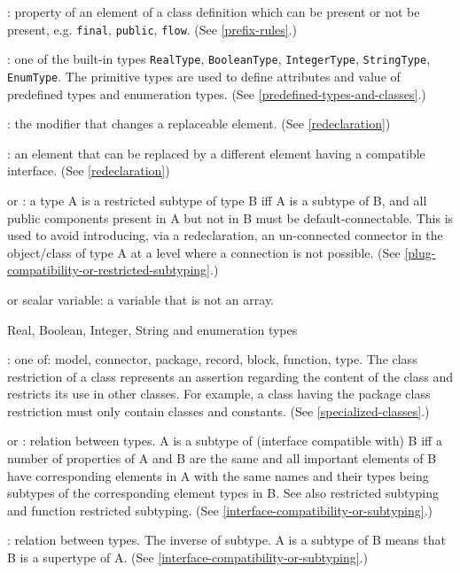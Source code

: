: property of an element of a class definition which can
be present or not be present, e.g. \lstinline!final!, \lstinline!public!, \lstinline!flow!. (See \autoref{prefix-rules}.)

: one of the built-in types \lstinline!RealType!,
\lstinline!BooleanType!, \lstinline!IntegerType!, \lstinline!StringType!, \lstinline!EnumType!. The primitive types are
used to define attributes and value of predefined types and enumeration
types. (See \autoref{predefined-types-and-classes}.)

: the modifier that changes a replaceable element.
(See \autoref{redeclaration})

: an element that can be replaced by a different
element having a compatible interface. (See \autoref{redeclaration})

 or : a type A
is a restricted subtype of type B iff A is a subtype of B, and all
public components present in A but not in B must be default-connectable.
This is used to avoid introducing, via a redeclaration, an un-connected
connector in the object/class of type A at a level where a connection is
not possible. (See \autoref{plug-compatibility-or-restricted-subtyping}.)

 or scalar variable: a variable that is not an array.

 Real, Boolean, Integer, String and enumeration
types

: one of: model, connector, package, record,
block, function, type. The class restriction of a class represents an
assertion regarding the content of the class and restricts its use in
other classes. For example, a class having the package class restriction
must only contain classes and constants. (See \autoref{specialized-classes}.)

 or : relation between
types. A is a subtype of (interface compatible with) B iff a number of
properties of A and B are the same and all important elements of B have
corresponding elements in A with the same names and their types being
subtypes of the corresponding element types in B. See also restricted
subtyping and function restricted subtyping. (See \autoref{interface-compatibility-or-subtyping}.)

: relation between types. The inverse of subtype. A is
a subtype of B means that B is a supertype of A. (See \autoref{interface-compatibility-or-subtyping}.)

